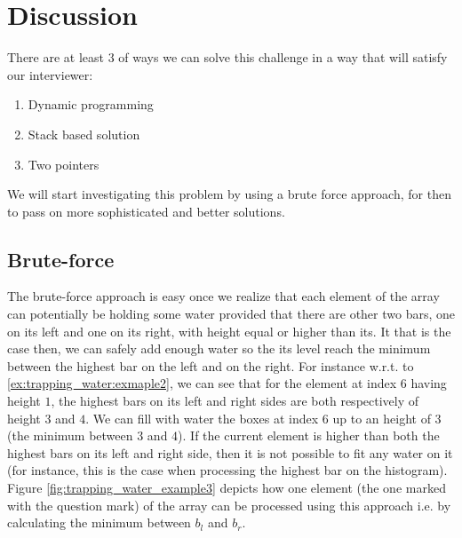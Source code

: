 %
%	

\section{Discussion}
\label{trapping_water:sec:discussion}
There are at least $3$ of ways we can solve this challenge in a way that will satisfy our interviewer:

\begin{enumerate}
	\item Dynamic programming
	\item Stack based solution
	\item Two pointers
\end{enumerate}
We will start investigating this problem by using a brute force approach, for then to pass on more sophisticated and better solutions.


\subsection{Brute-force}
\label{trapping_water:sec:bruteforce}

The brute-force approach is easy once we realize that each element of the array can potentially be holding some water provided that there are other two bars, one on its left and one on its right, with height equal or higher than its. It that is the case then, we can safely add enough water so the its level reach the minimum between the highest bar on the left and on the right.
For instance w.r.t. to \ref{ex:trapping_water:exmaple2}, we can see that for the element at index $6$ having height $1$, the highest bars on its left and right sides are both respectively of height $3$ and $4$. We can fill with water the boxes at index $6$ up to an height of $3$ (the minimum between $3$ and $4$).
If the current element is higher than both the highest bars on its left and right side, then it is not possible to fit any water on it (for instance, this is the case when processing the highest bar on the histogram).  Figure \ref{fig:trapping_water_example3} depicts how one element (the one marked with the question mark) of the array can be processed using this approach i.e. by calculating the minimum between $b_l$ and $b_r$.


